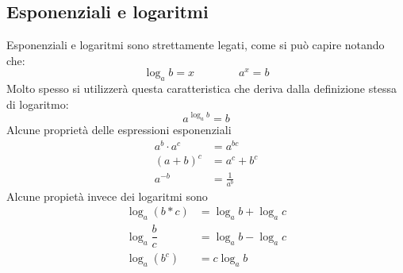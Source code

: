 \subsection{Esponenziali e logaritmi}
Esponenziali e logaritmi sono strettamente legati, come si può capire notando che:
\begin{equation*}
  \log_{a} b=x\qquad \qquad
 a^{x}=b
\end{equation*}
Molto spesso si utilizzerà questa caratteristica che deriva dalla definizione stessa di logaritmo:
\begin{equation*}
  a^{\log_{a}b}=b
\end{equation*}
Alcune proprietà delle espressioni esponenziali
\begin{align*}
  a^{b}\cdot a^{c}&=a^{bc}\\
  (a+b)^{c}&=a^{c}+b^{c}\\
  a^{-b}&=\frac{1}{a^{b}}
\end{align*}
Alcune propietà invece dei logaritmi sono
\begin{align*}
  \log_{a}(b*c)&=\log_{a}b+\log_{a}c\\
  \log_{a}\dfrac{b}{c}&=\log_{a}b-\log_{a}c\\
  \log_{a}(b^{c})&=c\log_{a}b
\end{align*}

